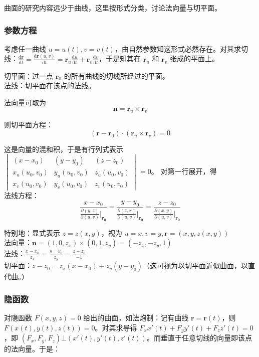 \documentclass[12pt, a4paper, UTF8, openany]{ctexbook}
\newcommand{\dif}{\mathrm{d}}
\newcommand{\mat}[1]{\mathbf{#1}}
\begin{document}
        曲面的研究内容远少于曲线，这里按形式分类，讨论法向量与切平面。

        \subsubsection{参数方程}
        考虑任一曲线 $u = u(t), v = v(t)$，由自然参数知这形式必然存在。对其求切线：$\frac{\dif \mat{r}}{\dif t} = \frac{\dif \mat{r}(u, v)}{\dif t} = \mat{r}_u \frac{\dif u}{\dif t} + \mat{r}_v\frac{\dif v}{\dif t}$，于是知其在 $\mat{r}_u$ 和 $\mat{r}_v$ 张成的平面上。

        切平面：过一点 $\mat{r}_0$ 的所有曲线的切线所经过的平面。\\
        法线：切平面在该点的法线。

        法向量可取为
        $$\mat{n} = \mat{r}_u \times \mat{r}_v$$
        
        则切平面方程：
        $$(\mat{r} - \mat{r}_0) \cdot (\mat{r}_u \times \mat{r}_v) = 0$$
        
        这是向量的混和积，于是有行列式表示 $\begin{vmatrix}
            (x - x_0) & (y - y_0) & (z - z_0) \\ 
            x_u (u_0, v_0) & y_u (u_0, v_0) & z_u (u_0, v_0) \\
            x_v (u_0, v_0) & y_v (u_0, v_0) & z_v (u_0, v_0)
        \end{vmatrix} = 0$。
        对第一行展开，得 \\
        法线方程：
        $$\dfrac{x - x_0}{\frac{\partial (y, z)}{\partial (u, v)}|_{\mat{r_0}}} = \dfrac{y - y_0}{\frac{\partial (z, x)}{\partial (u, v)}|_{\mat{r_0}}} = \dfrac{z - z_0}{\frac{\partial (x, y)}{\partial (u, v)}|_{\mat{r_0}}}$$

        {\heiti 特别地}：显式表示 $z = z(x, y)$，视为 $u = x, v = y, \mat{r} = (x, y, z(x, y))$ \\
        法向量：$\mat{n} = (1, 0, z_x) \times (0, 1, z_y) = (-z_x, -z_y, 1)$ \\
        法线：$\frac{x - x_0}{z_x} = \frac{y - y_0}{z_y} = \frac{z - z_0}{-1}$ \\
        切平面：$z - z_0 = z_x(x - x_0) + z_y(y - y_0)$（这可视为以切平面近似曲面，以直代曲。）

        \subsubsection{隐函数}
        对隐函数 $F(x, y, z) = 0$ 给出的曲面，如法炮制：记有曲线 $\mat{r} = \mat{r}(t)$，则 $F(x(t), y(t), z(t)) = 0$。对其求导得 $F_x x'(t) + F_y y'(t) + F_z z'(t) = 0$，即 $(F_x, F_y, F_z) \bot (x'(t), y'(t), z'(t))$。而垂直于任意切线的向量即该点的法向量。于是：
\end{document}
